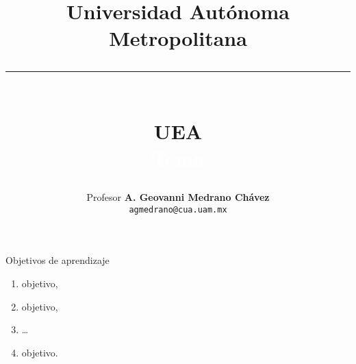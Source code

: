 \documentclass[table,dvipsnames,aspectratio=169]{beamer}
\title{{\LARGE Universidad Autónoma Metropolitana}\\
       \noindent\textcolor{Cua}{\rule{0.9\textwidth}{1mm}}\\
       {\large UEA}\\
       \textcolor{white}{Tema}\\
      }
\author[A. Geovanni Medrano Chávez]{
    \small 
    Profesor \textbf{A. Geovanni Medrano Chávez}\\
    \texttt{agmedrano@cua.uam.mx}
}
\date{}
\begin{document}
\begin{frame}[t,plain]
  \titlepage
\end{frame}

\begin{frame}{Objetivos de aprendizaje}
    \begin{singlecol}[0.5]
        \begin{enumerate}
          \item objetivo,
          \item objetivo,
          \item \ldots
          \item objetivo.
        \end{enumerate}
    \end{singlecol}
\end{frame}
\end{document}
